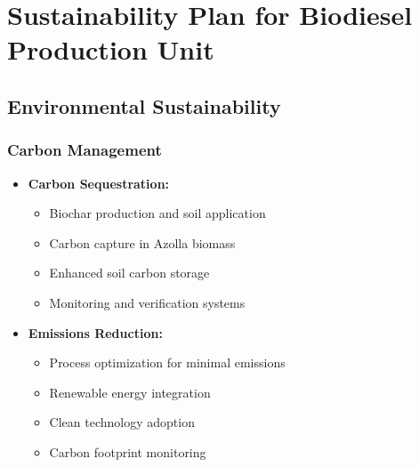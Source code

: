 \section{Sustainability Plan for Biodiesel Production Unit}

\subsection{Environmental Sustainability}

\subsubsection{Carbon Management}
\begin{itemize}
    \item \textbf{Carbon Sequestration:}
    \begin{itemize}
        \item Biochar production and soil application
        \item Carbon capture in Azolla biomass
        \item Enhanced soil carbon storage
        \item Monitoring and verification systems
    \end{itemize}
    
    \item \textbf{Emissions Reduction:}
    \begin{itemize}
        \item Process optimization for minimal emissions
        \item Renewable energy integration
        \item Clean technology adoption
        \item Carbon footprint monitoring
    \end{itemize}
\end{itemize}


